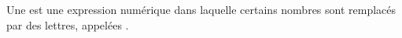 Une  est une expression numérique dans laquelle
certains nombres sont remplacés par des lettres, appelées .